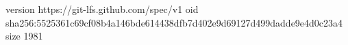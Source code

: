 version https://git-lfs.github.com/spec/v1
oid sha256:5525361c69cf08b4a146bde614438dfb7d402e9d69127d499dadde9e4d0c23a4
size 1981
